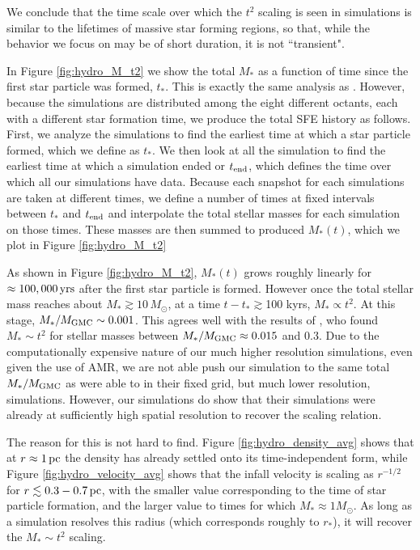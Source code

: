 \documentclass[../dissertation.tex]{subfiles}
\begin{document}
We conclude that the time scale over which the $t^2$ scaling is seen in simulations is similar to the 
lifetimes of massive star forming regions, so that, while the behavior we focus on may be of short duration, it is not ``transient".

In Figure \ref{fig:hydro_M_t2} we show the total $M_*$ as a function of time since 
the first star particle was formed, $t_*$.  This is exactly the same analysis 
as \citet{2015ApJ...800...49L}.  However, because the simulations are distributed 
among the eight different octants, each with a different star formation time, we 
produce the total SFE history as follows.  First, we analyze the simulations to 
find the earliest time at which a star particle formed, which we define as $t_*$.  
We then look at all the simulation to find the earliest time at which a simulation 
ended or $t_{\rm end}$, which defines the time over which all our simulations 
have data.  Because each snapshot for each simulations are taken at different 
times,  we define a number of times at fixed intervals between $t_*$ and 
$t_{\rm end}$ and interpolate the total stellar masses for each simulation on 
those times.  These masses are then summed to produced $M_*(t)$, which we plot 
in Figure \ref{fig:hydro_M_t2}

As shown in Figure \ref{fig:hydro_M_t2}, $M_*(t)$ grows roughly linearly for 
$\approx100,000\,\rm yrs$ after the first star particle is formed.  However 
once the total stellar mass reaches about $M_* \gtrsim 10\,M_{\odot}$, at a time 
$t-t_*\gtrsim $100 kyrs, $M_* \propto t^2$.  At this stage, 
$M_*/M_{\rm GMC} \sim 0.001$. This agrees well with the results of
\citet{2015ApJ...800...49L}, who found $M_*\sim t^2$ for stellar masses between 
$M_*/M_{\rm GMC} \approx 0.015$ and $0.3$.  Due to the computationally expensive 
nature of our much higher resolution simulations, even given the use of AMR,
we are not able push our simulation to the same total $M_*/M_{\rm GMC}$ 
as \citet{2015ApJ...800...49L} were able to in their fixed grid, but much lower resolution,
simulations. However, our simulations do show that their simulations were already at 
sufficiently high spatial resolution to recover the scaling relation. 

The reason for this is not hard to find. Figure \ref{fig:hydro_density_avg} shows 
that at $r\approx1\,\rm pc$ the density has already settled onto its time-independent form, while 
Figure \ref{fig:hydro_velocity_avg} shows that the infall velocity is scaling as $r^{-1/2}$ for 
$r\lesssim 0.3-0.7\,\rm pc$, with the smaller value corresponding to the time of star particle 
formation, and the larger value to times for which $M_*\approx 1M_\odot$. As long as
a simulation resolves this radius (which corresponds roughly to $r_*$), it will recover the
$M_*\sim t^2$ scaling. 
\end{document}
